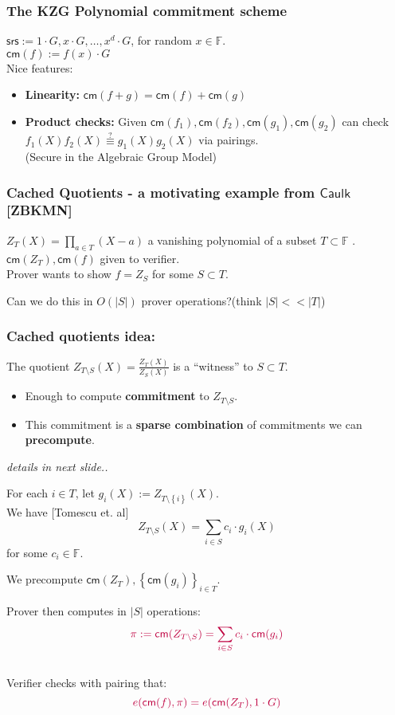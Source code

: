 \documentclass[shadesubsections,compress,14pt,mathserif]{beamer}
\newcommand{\F}{\ensuremath{{\mathbb F}}}
\newcommand{\set}[1]{\ensuremath{\left\{#1\right\}}}
\newcommand{\sett}[2]{\ensuremath{\left\{#1\right\}_{#2}}}
\newcommand{\enc}[1]{\ensuremath{#1\cdot G}}
\newcommand{\cm}{\ensuremath{\mathsf{cm}}}
\newcommand{\defeq}{\ensuremath{:=}}
\newcommand{\nl}{\\ \pause \vspace{0.2in}}
\newcommand{\nlnp}{\\ \vspace{0.2in}}
\newcommand{\caulk}{{\mathsf{Caulk}}}
\newcommand{\srs}{\ensuremath{\mathsf{srs}}}
\begin{document}
\begin{frame}
 \frametitle{The KZG Polynomial commitment scheme}   %
 $\srs \defeq \enc{1},\enc{x},\ldots,\enc{x^d}$, for random $x\in \F$.\\ 
 $\cm(f)\defeq   \enc{f(x)}$\\ 
 \vspace{0.2in}
 Nice features:\pause
 \begin{itemize}
  \item \textbf{Linearity:} $\cm(f+g) = \cm(f)+\cm(g)$\pause
  \item \textbf{Product checks:} Given $\cm(f_1),\cm(f_2),\cm(g_1),\cm(g_2)$ can check $f_1(X)f_2(X)\stackrel{?}{\equiv} g_1(X)g_2(X)$ via pairings.\\
  (Secure in the Algebraic Group Model)
 \end{itemize}

\end{frame}
\begin{frame}
 \frametitle{Cached Quotients - a motivating example from $\caulk$[ZBKMN]}\pause
 $Z_T(X)=\prod_{a\in T} (X-a)$ 
 a vanishing polynomial of a subset $T\subset \F$ .\nl
 $\cm(Z_T),\cm(f)$ given to verifier.\pause \\
 Prover wants to show $f=Z_S$ for some $S\subset T$.\nl
 
 Can we do this in $O(|S|)$ prover operations?(think $|S|<<|T|$)
\end{frame}
\begin{frame}
\frametitle{Cached quotients idea:}
 The quotient $Z_{T\setminus S}(X) =\frac{Z_T(X)}{Z_S(X)}$ is a ``witness'' to $S\subset T$. \nl
\begin{itemize}
 \item Enough to compute \textbf{commitment} to $Z_{T\setminus S}$. \pause
 \item This commitment is a \textbf{sparse combination} of commitments we can \textbf{precompute}.
\end{itemize}
\emph{details in next slide..}
\end{frame}

\begin{frame}
 For each $i\in T$, let $g_i(X)\defeq Z_{T\setminus\set{i}}(X)$.\nl
 We have {\small[Tomescu et. al]}
 \[Z_{T\setminus S} (X) = \sum_{i\in S} c_i\cdot g_i(X)\]
 for some $c_i\in \F$.\nl
 

 We precompute $\cm(Z_T),\sett{\cm(g_i)}{i\in T}$.\nlnp
\end{frame} 
 \begin{frame}
 Prover then computes in $|S|$ operations:
 \[\color{purple}\pi:=\cm(Z_{T\setminus S}) = \sum_{i\in S} c_i\cdot \cm(g_i)\]\nl
Verifier checks with pairing that:
\[\color{purple}e(\cm(f),\pi) =e(\cm(Z_T),\enc{1})\]
\end{frame}
\end{document}

